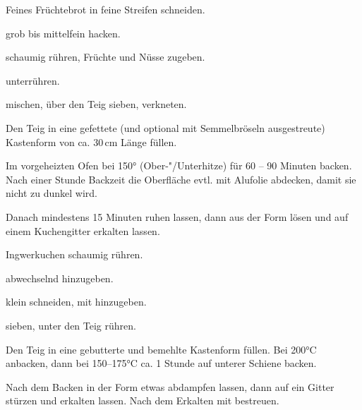 \begin{recipe}{Feines Früchtebrot}
  in feine Streifen schneiden.
  
  grob bis mittelfein hacken.
  
  schaumig rühren, Früchte und Nüsse zugeben.
  
  unterrühren.
  
  mischen, über den Teig sieben, verkneten.

  Den Teig in eine gefettete (und optional mit Semmelbröseln
  ausgestreute) Kastenform von ca. 30\,cm Länge füllen.
  
  Im vorgeheizten Ofen bei 150° (Ober-"/Unterhitze) für 60 -- 90 Minuten
  backen. Nach einer Stunde Backzeit die Oberfläche evtl. mit Alufolie
  abdecken, damit sie nicht zu dunkel wird.

  Danach mindestens 15 Minuten ruhen lassen, dann aus der Form lösen und
  auf einem Kuchengitter erkalten lassen.
\end{recipe}


\begin{recipe}{Ingwerkuchen}
  schaumig rühren.
  
  abwechselnd hinzugeben.
  
  klein schneiden, mit
  hinzugeben.
  
  sieben, unter den Teig rühren.

  Den Teig in eine gebutterte und bemehlte Kastenform füllen. Bei 200°C
  anbacken, dann bei 150--175°C ca. 1 Stunde auf unterer Schiene backen.

  Nach dem Backen in der Form etwas abdampfen lassen, dann auf ein
  Gitter stürzen und erkalten lassen. Nach dem Erkalten mit
  bestreuen.
\end{recipe}



